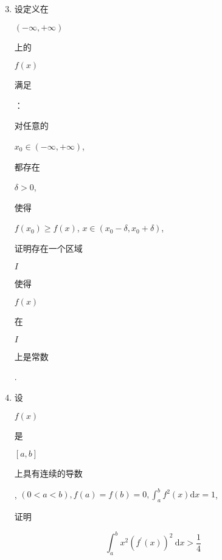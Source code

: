 \documentclass[10pt]{article}
\begin{document}
\begin{enumerate}
  \setcounter{enumi}{2}
  \item \begin{CJK}{UTF8}{mj}设定义在\end{CJK} $(-\infty,+\infty)$ \begin{CJK}{UTF8}{mj}上的\end{CJK} $f(x)$ \begin{CJK}{UTF8}{mj}满足\end{CJK}：\begin{CJK}{UTF8}{mj}对任意的\end{CJK} $x_{0} \in(-\infty,+\infty)$, \begin{CJK}{UTF8}{mj}都存在\end{CJK} $\delta>0$, \begin{CJK}{UTF8}{mj}使得\end{CJK} $f\left(x_{0}\right) \geqslant f(x)$, $x \in\left(x_{0}-\delta, x_{0}+\delta\right)$, \begin{CJK}{UTF8}{mj}证明存在一个区域\end{CJK} $I$ \begin{CJK}{UTF8}{mj}使得\end{CJK} $f(x)$ \begin{CJK}{UTF8}{mj}在\end{CJK} $I$ \begin{CJK}{UTF8}{mj}上是常数\end{CJK}.

  \item \begin{CJK}{UTF8}{mj}设\end{CJK} $f(x)$ \begin{CJK}{UTF8}{mj}是\end{CJK} $[a, b]$ \begin{CJK}{UTF8}{mj}上具有连续的导数\end{CJK}, $(0<a<b), f(a)=f(b)=0, \int_{a}^{b} f^{2}(x) \mathrm{d} x=1$, \begin{CJK}{UTF8}{mj}证明\end{CJK}

\end{enumerate}
$$
\int_{a}^{b} x^{2}\left(f^{\prime}(x)\right)^{2} \mathrm{~d} x>\frac{1}{4}
$$
\end{document}
